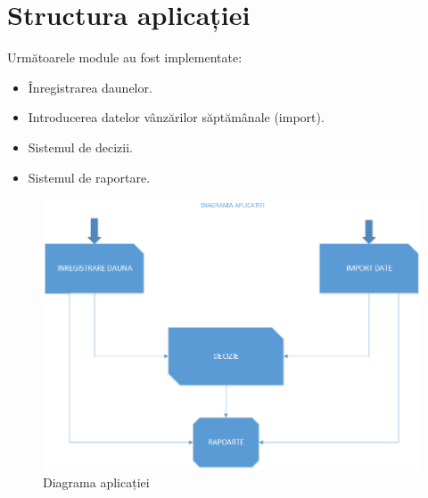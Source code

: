 \section{Structura aplicației}

	Următoarele module au fost implementate:
	\begin{itemize}
		\item Înregistrarea daunelor.
		\item Introducerea datelor vânzărilor săptămânale (import).
		\item Sistemul de decizii.
		\item Sistemul de raportare.
	\end{itemize}

	\begin{figure}[h]
		\includegraphics[width=\linewidth]{../imagini/diagrama_aplicatiei.png}
		\caption{Diagrama aplicației}
		\label{fig:diagrama_aplicatiei}
	\end{figure}
